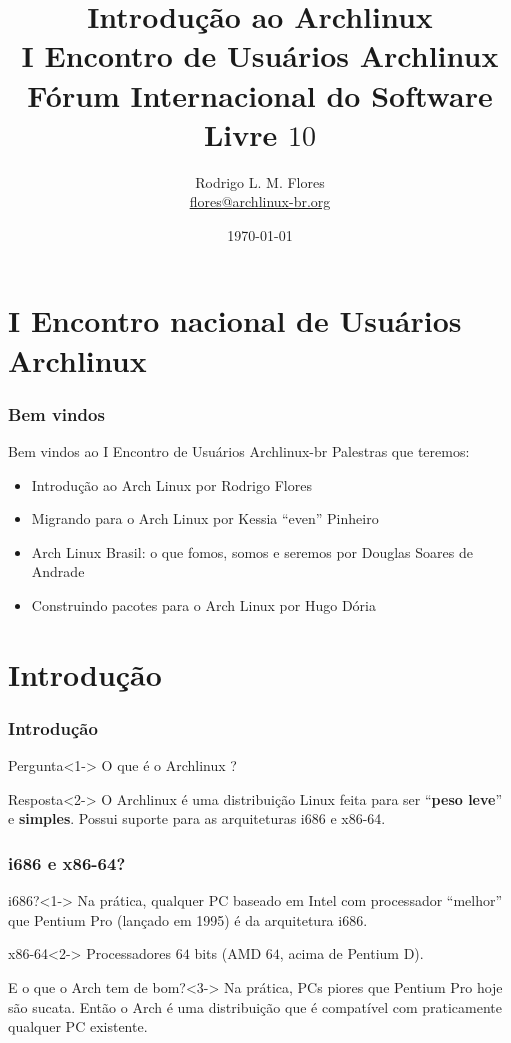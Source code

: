 \documentclass{beamer}
\title{Introdução ao Archlinux\\I Encontro de Usuários Archlinux\\Fórum Internacional do Software Livre $10$}
\author{Rodrigo L. M. Flores \\ \url{flores@archlinux-br.org}}
\institute{Projeto Archlinux-BR}
\begin{document}
\date{\today}

\frame{\titlepage}
\section{I Encontro nacional de Usuários Archlinux}


\begin{frame}
    \frametitle{Bem vindos}
    \begin{block}{Bem vindos ao I Encontro de Usuários Archlinux-br}
        Palestras que teremos:
        \begin{itemize}
            \item<1-> Introdução ao Arch Linux por Rodrigo Flores
            \item<2-> Migrando para o Arch Linux por Kessia ``even'' Pinheiro
            \item<3-> Arch Linux Brasil: o que fomos, somos e seremos por Douglas Soares de Andrade
            \item<4-> Construindo pacotes para o Arch Linux por Hugo Dória
        \end{itemize}
    \end{block}
\end{frame}

\section{Introdução}


\begin{frame}
    \frametitle{Introdução}
    \begin{block}{Pergunta}<1->
        O que é o Archlinux ?
    \end{block}
    \begin{block}{Resposta}<2->
            O Archlinux é uma distribuição Linux feita para ser ``\textbf{peso leve}'' e \textbf{simples}. Possui suporte para as arquiteturas i686 e x86-64. 
    \end{block}
    
\end{frame}

\begin{frame}
    \frametitle{i686 e x86-64?}
    \begin{block}{i686?}<1->
        Na prática, qualquer PC baseado em Intel com processador ``melhor'' que Pentium Pro (lançado em 1995) é da arquitetura i686. 
    \end{block}
    \begin{block}{x86-64}<2->
        Processadores $64$ bits (AMD $64$, acima de Pentium D). 
    \end{block}
    \begin{block}{E o que o Arch tem de bom?}<3->
        Na prática, PCs piores que Pentium Pro hoje são sucata. Então o Arch é uma distribuição que é compatível com praticamente qualquer PC existente.
    \end{block}

\end{frame}
\end{document}
